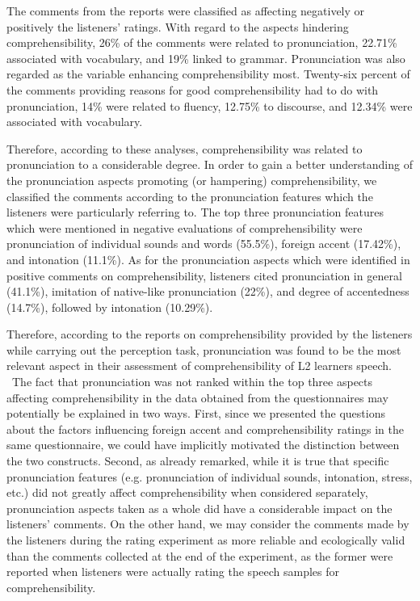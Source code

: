 \documentclass[12pt]{article}
\newenvironment{styleStandard}{\setlength\leftskip{0cm}\setlength\rightskip{0cm plus 1fil}\setlength\parindent{0cm}\setlength\parfillskip{0pt plus 1fil}\setlength\parskip{0in plus 1pt}\writerlistparindent\writerlistleftskip\leavevmode\normalfont\normalsize\writerlistlabel\ignorespaces}{\unskip\vspace{0.111in plus 0.0111in}\par}
\newcommand\writerlistleftskip{}
\newcommand\writerlistparindent{}
\newcommand\writerlistlabel{}
\begin{document}
\begin{styleStandard}
The comments from the reports were classified as affecting negatively or positively the listeners’ ratings. With regard to the aspects hindering comprehensibility, 26\% of the comments were related to pronunciation, 22.71\% associated with vocabulary, and 19\% linked to grammar. Pronunciation was also regarded as the variable enhancing comprehensibility most. Twenty-six percent of the comments providing reasons for good comprehensibility had to do with pronunciation, 14\% were related to fluency, 12.75\% to discourse, and 12.34\% were associated with vocabulary. 
\end{styleStandard}

\begin{styleStandard}
Therefore, according to these analyses, comprehensibility was related to pronunciation to a considerable degree. In order to gain a better understanding of the pronunciation aspects promoting (or hampering) comprehensibility, we classified the comments according to the pronunciation features which the listeners were particularly referring to. The top three pronunciation features which were mentioned in negative evaluations of comprehensibility were pronunciation of individual sounds and words (55.5\%), foreign accent (17.42\%), and intonation (11.1\%). As for the pronunciation aspects which were identified in positive comments on comprehensibility, listeners cited pronunciation in general (41.1\%), imitation of native-like pronunciation (22\%), and degree of accentedness (14.7\%), followed by intonation (10.29\%).
\end{styleStandard}

\begin{styleStandard}
Therefore, according to the reports on comprehensibility provided by the listeners while carrying out the perception task, pronunciation was found to be the most relevant aspect in their assessment of comprehensibility of L2 learners{\textquotesingle} speech. \ The fact that pronunciation was not ranked within the top three aspects affecting comprehensibility in the data obtained from the questionnaires may potentially be explained in two ways. First, since we presented the questions about the factors influencing foreign accent and comprehensibility ratings in the same questionnaire, we could have implicitly motivated the distinction between the two constructs. Second, as already remarked, while it is true that specific pronunciation features (e.g. pronunciation of individual sounds, intonation, stress, etc.) did not greatly affect comprehensibility when considered separately, pronunciation aspects taken as a whole did have a considerable impact on the listeners’ comments. On the other hand, we may consider the comments made by the listeners during the rating experiment as more reliable and ecologically valid than the comments collected at the end of the experiment, as the former were reported when listeners were actually rating the speech samples for comprehensibility. 
\end{styleStandard}
\end{document}
